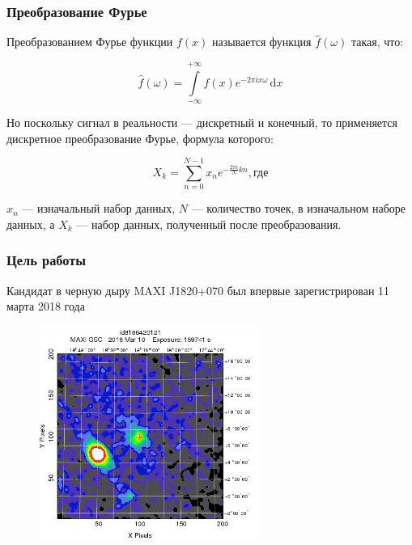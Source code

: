 \documentclass[10pt, pdf, hyperref={unicode}]{beamer}
\begin{document}
	\begin{frame}
		\frametitle{Преобразование Фурье}
		
		Преобразованием Фурье функции $f(x)$ называется функция $\hat{f}(\omega)$ такая, что:		
		
		\begin{block}{}
			$$ \hat{f}(\omega) = \int\limits^{+\infty}_{-\infty} f(x) e^{-2 \pi i x \omega} \, \mathrm{d} x $$
		\end{block}
		
		\centering
		
		Но поскольку сигнал в реальности --- дискретный и конечный, то применяется дискретное преобразование Фурье, формула которого:
		
		\begin{block}{}
			$$ 	X_k = \sum^{N - 1}_{n = 0} x_n e^{-\frac{2 \pi i}{N} k n}, \text{где} $$
		\end{block}
		
		$x_n$ --- изначальный набор данных, $N$ ---	количество точек, в изначальном наборе данных, а $X_k$ --- набор данных, полученный после преобразования.

	\end{frame}

	\begin{frame}
	
		\frametitle{Цель работы}
		
		Кандидат в черную дыру MAXI J1820+070 был впервые зарегистрирован 11 марта 2018 года
		\begin{figure}
		\centering		
		\includegraphics[width = 0.64\textwidth]{MAXI_J1820}
		\end{figure}
	
	\end{frame}
	
\end{document}
